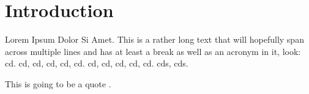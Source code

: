 \chapter{Introduction}

Lorem Ipsum Dolor Si Amet.
This is a rather long text that will hopefully span across multiple lines and has at least a break as well as an acronym in it, look: \ac{cd}.
\ac{cd}, \ac{cd}, \acl{cd}, \acs{cd}, \acf{cd}.
\Ac{cd}, \Ac{cd}, \Acl{cd}, \Acs{cd}, \Acf{cd}.
\Acfp{cd}, \aclp{cd}.

This is going to be a quote \cite{knuth86}.
